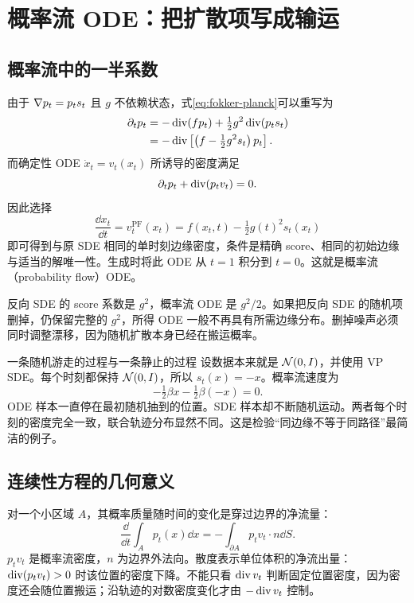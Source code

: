 \section{概率流 ODE：把扩散项写成输运}\label{sec:pfode}
\subsection{概率流中的一半系数}
由于 $\nabla p_t=p_ts_t$ 且 $g$ 不依赖状态，式\eqref{eq:fokker-planck}可以重写为
\begin{align}
 \partial_tp_t
 &=-\operatorname{div}(f p_t)+\tfrac12g^2\operatorname{div}(p_ts_t)\\
 &=-\operatorname{div}\left[\left(f-\tfrac12g^2s_t\right)p_t\right].
\end{align}
而确定性 ODE $\dot x_t=v_t(x_t)$ 所诱导的密度满足
\begin{equation}
 \partial_tp_t+\operatorname{div}(p_tv_t)=0.
\end{equation}
因此选择
\begin{equation}\boxed{
 \frac{\dd x_t}{\dd t}=v_t^{\mathrm{PF}}(x_t)
 =f(x_t,t)-\tfrac12g(t)^2s_t(x_t)
 }\label{eq:pfode}\end{equation}
即可得到与原 SDE 相同的单时刻边缘密度，条件是精确 score、相同的初始边缘与适当的解唯一性。生成时将此 ODE 从 $t=1$ 积分到 $t=0$。这就是概率流（probability flow）ODE\cite{r_sde}。

反向 SDE 的 score 系数是 $g^2$，概率流 ODE 是 $g^2/2$。如果把反向 SDE 的随机项删掉，仍保留完整的 $g^2$，所得 ODE 一般不再具有所需边缘分布。删掉噪声必须同时调整漂移，因为随机扩散本身已经在搬运概率。

\begin{examplebox}{一条随机游走的过程与一条静止的过程}
设数据本来就是 $\mathcal{N}(0,I)$，并使用 VP SDE。每个时刻都保持 $\mathcal{N}(0,I)$，所以 $s_t(x)=-x$。概率流速度为
\begin{equation}
 -\tfrac12\beta x-\tfrac12\beta(-x)=0.
\end{equation}
ODE 样本一直停在最初随机抽到的位置。SDE 样本却不断随机运动。两者每个时刻的密度完全一致，联合轨迹分布显然不同。这是检验“同边缘不等于同路径”最简洁的例子。
\end{examplebox}

\subsection{连续性方程的几何意义}
对一个小区域 $A$，其概率质量随时间的变化是穿过边界的净流量：
\begin{equation}
 \frac{\dd}{\dd t}\int_Ap_t(x)\dd x
 =-\int_{\partial A}p_tv_t\cdot n\dd S.
\end{equation}
$p_tv_t$ 是概率流密度，$n$ 为边界外法向。散度表示单位体积的净流出量：$\operatorname{div}(p_tv_t)>0$ 时该位置的密度下降。不能只看 $\operatorname{div} v_t$ 判断固定位置密度，因为密度还会随位置搬运；沿轨迹的对数密度变化才由 $-\operatorname{div} v_t$ 控制。

